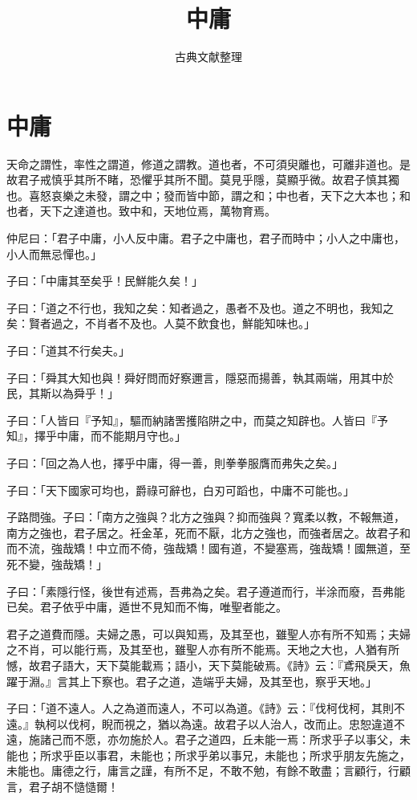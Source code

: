 \documentclass[12pt,a4paper]{ctexbook}
\title{中庸}
\author{古典文献整理}
\date{}
\begin{document}
\maketitle
\tableofcontents
\newpage
\section{中庸}
天命之謂性，率性之謂道，修道之謂教。道也者，不可須臾離也，可離非道也。是故君子戒慎乎其所不睹，恐懼乎其所不聞。莫見乎隱，莫顯乎微。故君子慎其獨也。喜怒哀樂之未發，謂之中；發而皆中節，謂之和；中也者，天下之大本也；和也者，天下之達道也。致中和，天地位焉，萬物育焉。\par
仲尼曰：「君子中庸，小人反中庸。君子之中庸也，君子而時中；小人之中庸也，小人而無忌憚也。」\par
子曰：「中庸其至矣乎！民鮮能久矣！」\par
子曰：「道之不行也，我知之矣：知者過之，愚者不及也。道之不明也，我知之矣：賢者過之，不肖者不及也。人莫不飲食也，鮮能知味也。」\par
子曰：「道其不行矣夫。」\par
子曰：「舜其大知也與！舜好問而好察邇言，隱惡而揚善，執其兩端，用其中於民，其斯以為舜乎！」\par
子曰：「人皆曰『予知』，驅而納諸罟擭陷阱之中，而莫之知辟也。人皆曰『予知』，擇乎中庸，而不能期月守也。」\par
子曰：「回之為人也，擇乎中庸，得一善，則拳拳服膺而弗失之矣。」\par
子曰：「天下國家可均也，爵祿可辭也，白刃可蹈也，中庸不可能也。」\par
子路問強。子曰：「南方之強與？北方之強與？抑而強與？寬柔以教，不報無道，南方之強也，君子居之。衽金革，死而不厭，北方之強也，而強者居之。故君子和而不流，強哉矯！中立而不倚，強哉矯！國有道，不變塞焉，強哉矯！國無道，至死不變，強哉矯！」\par
子曰：「素隱行怪，後世有述焉，吾弗為之矣。君子遵道而行，半涂而廢，吾弗能已矣。君子依乎中庸，遁世不見知而不悔，唯聖者能之。\par
君子之道費而隱。夫婦之愚，可以與知焉，及其至也，雖聖人亦有所不知焉；夫婦之不肖，可以能行焉，及其至也，雖聖人亦有所不能焉。天地之大也，人猶有所憾，故君子語大，天下莫能載焉；語小，天下莫能破焉。《詩》云：『鳶飛戾天，魚躍于淵。』言其上下察也。君子之道，造端乎夫婦，及其至也，察乎天地。」\par
子曰：「道不遠人。人之為道而遠人，不可以為道。《詩》云：『伐柯伐柯，其則不遠。』執柯以伐柯，睨而視之，猶以為遠。故君子以人治人，改而止。忠恕違道不遠，施諸己而不愿，亦勿施於人。君子之道四，丘未能一焉：所求乎子以事父，未能也；所求乎臣以事君，未能也；所求乎弟以事兄，未能也；所求乎朋友先施之，未能也。庸德之行，庸言之謹，有所不足，不敢不勉，有餘不敢盡；言顧行，行顧言，君子胡不慥慥爾！\par
\end{document}
